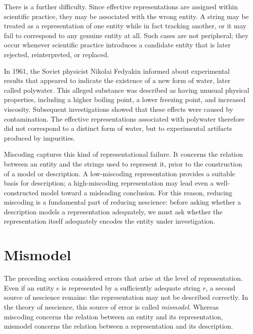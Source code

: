 There is a further difficulty. Since effective representations are assigned within scientific practice, they may be associated with the wrong entity. A string may be treated as a representation of one entity while in fact tracking another, or it may fail to correspond to any genuine entity at all. Such cases are not peripheral; they occur whenever scientific practice introduces a candidate entity that is later rejected, reinterpreted, or replaced.

\begin{example}
\label{ex:polywater}
In 1961, the Soviet physicist Nikolai Fedyakin informed about experimental results that appeared to indicate the existence of a new form of water, later called polywater. This alleged substance was described as having unusual physical properties, including a higher boiling point, a lower freezing point, and increased viscosity. Subsequent investigations showed that these effects were caused by contamination. The effective representations associated with polywater therefore did not correspond to a distinct form of water, but to experimental artifacts produced by impurities.
\end{example}

Miscoding captures this kind of representational failure. It concerns the relation between an entity and the strings used to represent it, prior to the construction of a model or description. A low-miscoding representation provides a suitable basis for description; a high-miscoding representation may lead even a well-constructed model toward a misleading conclusion. For this reason, reducing miscoding is a fundamental part of reducing nescience: before asking whether a description models a representation adequately, we must ask whether the representation itself adequately encodes the entity under investigation.

%
%

\section{Mismodel}
\label{sec:ch1_mismodel}

The preceding section considered errors that arise at the level of representation. Even if an entity $e$ is represented by a sufficiently adequate string $r$, a second source of nescience remains: the representation may not be described correctly. In the theory of nescience, this source of error is called \emph{mismodel}. Whereas miscoding concerns the relation between an entity and its representation, mismodel concerns the relation between a representation and its description.

